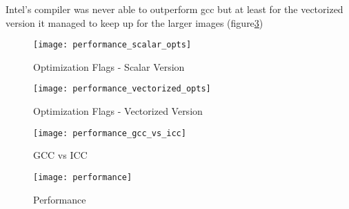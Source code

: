 Intel's compiler was never able to outperform gcc but at least for the
vectorized version it managed to keep up for the larger images (figure\ref{fig:perf_gcc_vs_icc})

\begin{figure}[H]
  \texttt{[image: performance\_scalar\_opts]}
  \caption{Optimization Flags - Scalar Version}
  \label{fig:perf_scal}
\end{figure}

\begin{figure}[H]
  \texttt{[image: performance\_vectorized\_opts]}
  \caption{Optimization Flags - Vectorized Version}
  \label{fig:perf_vec}
\end{figure}

\begin{figure}[H]
  \texttt{[image: performance\_gcc\_vs\_icc]}
  \caption{GCC vs ICC}
  \label{fig:perf_gcc_vs_icc}
\end{figure}



\begin{figure}[!ht]
  \texttt{[image: performance]}
  \caption{Performance}
\end{figure}






